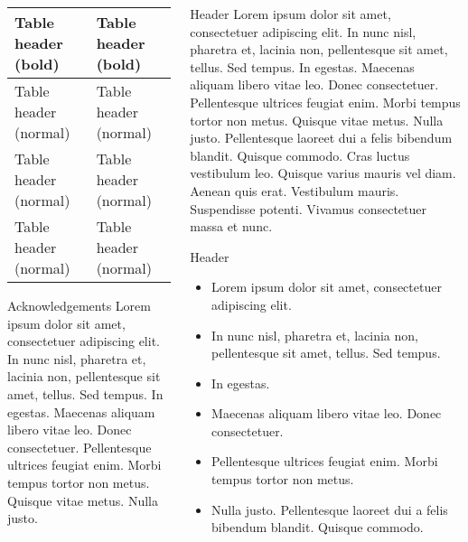 \documentclass[xcolor={table}]{beamer}
\begin{document}
\begin{frame}[fragile=singleslide,t]
\begin{columns}[onlytextwidth,T]
\begin{column}{.47\textwidth}
\begin{table}
\begin{tabularx}{\linewidth}{  X  X  }
\toprule
\textbf{Table header (bold)} & \textbf{Table header (bold)} \\
\midrule
Table header (normal) & Table header (normal) \\
\midrule
Table header (normal) & Table header (normal) \\
\midrule
Table header (normal) & Table header (normal) \\
\bottomrule
\end{tabularx}
\end{table}

\begin{block}{Acknowledgements}
Lorem ipsum dolor sit amet, consectetuer adipiscing elit. In nunc nisl, pharetra et, lacinia non, pellentesque sit amet, tellus. Sed tempus. In egestas. Maecenas aliquam libero vitae leo. Donec consectetuer. Pellentesque ultrices feugiat enim. Morbi tempus tortor non metus. Quisque vitae metus. Nulla justo.
\end{block}

\end{column}


\begin{column}{.47\textwidth}

\begin{block}{Header}
Lorem ipsum dolor sit amet, consectetuer adipiscing elit. In nunc nisl, pharetra et, lacinia non, pellentesque sit amet, tellus. Sed tempus. In egestas. Maecenas aliquam libero vitae leo. Donec consectetuer. Pellentesque ultrices feugiat enim. Morbi tempus tortor non metus. Quisque vitae metus. Nulla justo. Pellentesque laoreet dui a felis bibendum blandit. Quisque commodo. 
Cras luctus vestibulum leo. Quisque varius mauris vel diam. Aenean quis erat. Vestibulum mauris. Suspendisse potenti. Vivamus consectetuer massa et nunc. 
\end{block}

\begin{block}{Header}
\begin{itemize}
\item Lorem ipsum dolor sit amet, consectetuer adipiscing elit.
\item In nunc nisl, pharetra et, lacinia non, pellentesque sit amet, tellus. Sed tempus. \citep{Cooper13}
\item In egestas. \citep{Crank1975}
\item Maecenas aliquam libero vitae leo. Donec consectetuer. 
\item Pellentesque ultrices feugiat enim. Morbi tempus tortor non metus. 
\item Nulla justo. Pellentesque laoreet dui a felis bibendum blandit. Quisque commodo. 
\end{itemize}
\end{block}


\end{column}
\end{columns}
\end{frame}
\end{document}
